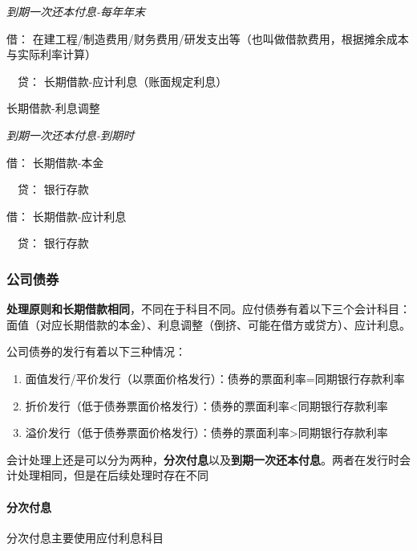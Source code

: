 \documentclass[UTF8,12pt]{ctexart}
\newenvironment{Dr}{\noindent 借：}{\par}
\newenvironment{Cr}{\noindent \ \ 贷：}{\par}
\numberwithin{equation}{section} %
\numberwithin{figure}{section}
\numberwithin{table}{section}
\begin{document}
	\textit{到期一次还本付息-每年年末}
	
	\begin{Dr}
		在建工程/制造费用/财务费用/研发支出等（也叫做借款费用，根据摊余成本与实际利率计算）
	\end{Dr}
	\begin{Cr}
		长期借款-应计利息（账面规定利息）
		
		长期借款-利息调整
	\end{Cr}

	\textit{到期一次还本付息-到期时}
	
	\begin{Dr}
		长期借款-本金
	\end{Dr}
	\begin{Cr}
		银行存款
	\end{Cr}

	\begin{Dr}
		长期借款-应计利息
	\end{Dr}
	\begin{Cr}
		银行存款
	\end{Cr}
	
	\subsubsection{公司债券}
	\textbf{处理原则和长期借款相同}，不同在于科目不同。应付债券有着以下三个会计科目：面值（对应长期借款的本金）、利息调整（倒挤、可能在借方或贷方）、应计利息。
	
	公司债券的发行有着以下三种情况：
	
	\begin{enumerate}
		\item 面值发行/平价发行（以票面价格发行）：债券的票面利率=同期银行存款利率
		
		\item 折价发行（低于债券票面价格发行）：债券的票面利率<同期银行存款利率
		
		\item 溢价发行（低于债券票面价格发行）：债券的票面利率>同期银行存款利率
	\end{enumerate}

	会计处理上还是可以分为两种，\textbf{分次付息}以及\textbf{到期一次还本付息}。两者在发行时会计处理相同，但是在后续处理时存在不同
	
	\paragraph{分次付息} 分次付息主要使用应付利息科目
	
\end{document}
